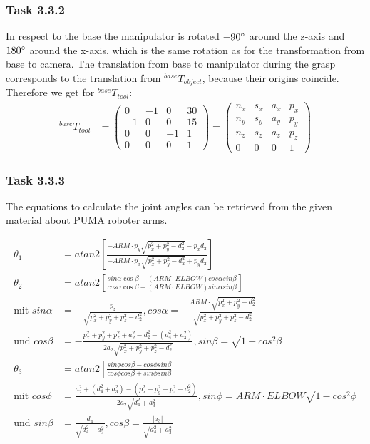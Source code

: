 \subsubsection*{Task 3.3.2}
In respect to the base the manipulator is rotated $-90\degree$ around the z-axis and $180\degree$ around the x-axis, which is the same rotation as for the transformation from base to camera.
The translation from base to manipulator during the grasp corresponds to the translation from $^{base}T_{object}$, because their origins coincide.
Therefore we get for $^{base}T_{tool}$:
\begin{align*}
^{base}T_{tool} &=
\begin{pmatrix}
0 & -1 & 0 & 30\\
-1 & 0 & 0 & 15\\
0 & 0 & -1 & 1\\
0 & 0 & 0 & 1
\end{pmatrix}
=
\begin{pmatrix}
n_x & s_x & a_x & p_x\\
n_y & s_y & a_y & p_y\\
n_z & s_z & a_z & p_z\\
0 & 0 & 0 & 1
\end{pmatrix}
\end{align*}

\subsubsection*{Task 3.3.3}
The equations to calculate the joint angles can be retrieved from the given material about PUMA roboter arms.

\begin{align*}
\theta_1 &=atan2\left[\frac{-ARM\cdot p_y\sqrt{p_x^2+p_y^2-d_2^2}-p_xd_2}{-ARM\cdot p_x\sqrt{p_x^2+p_y^2-d_2^2}+p_yd_2}\right]\\
\theta_2 &=atan2\left[\frac{sin\alpha\cos\beta+(ARM\cdot ELBOW)cos\alpha sin\beta}{cos\alpha\cos\beta-(ARM\cdot ELBOW)sin\alpha sin\beta}\right]\\
\text{mit } sin\alpha &= -\frac{p_z}{\sqrt{p_x^2+p_y^2+p_z^2-d_2^2}}, cos\alpha = -\frac{ARM\cdot \sqrt{p_x^2+p_y^2-d_2^2}}{\sqrt{p_x^2+p_y^2+p_z^2-d_2^2}}\\
\text{und } cos\beta &= -\frac{p_x^2+p_y^2+p_z^2+a_2^2-d_2^2-(d_4^2+a_3^2)}{2a_2\sqrt{p_x^2+p_y^2+p_z^2-d_2^2}}, sin\beta = \sqrt{1-cos^2\beta}\\
\theta_3 &=atan2\left[\frac{sin\phi cos\beta-cos\phi sin\beta}{cos\phi cos\beta+sin\phi sin\beta}\right]\\
\text{mit } cos\phi &= \frac{a_2^2+(d_4^2+a_3^2)-(p_x^2+p_y^2+p_z^2-d_2^2)}{2a_2\sqrt{d_4^2+a_3^2}}, sin\phi = ARM\cdot ELBOW\sqrt{1-cos^2\phi}\\
\text{und } sin\beta &= \frac{d_4}{\sqrt{d_4^2+a_3^2}}, cos\beta = \frac{|a_3|}{\sqrt{d_4^2+a_3^2}}
\end{align*}

